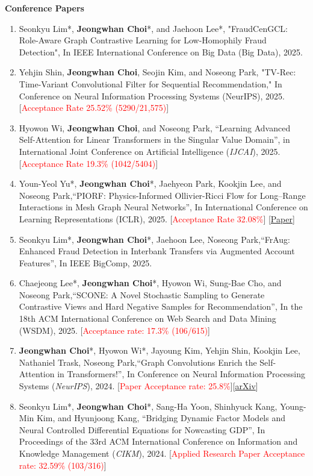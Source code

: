 \documentclass[10pt]{article}
\newenvironment{changemargin}[2]{
  \begin{list}{}{
    \setlength{\topsep}{0pt}
    \setlength{\leftmargin}{#1}
    \setlength{\rightmargin}{#2}
    \setlength{\listparindent}{\parindent}
    \setlength{\itemindent}{\parindent}
    \setlength{\parsep}{\parskip}
  }
  \item[]}{\end{list}
}
\newcommand{\RED}[1]{\textcolor{red}{#1}}
\newenvironment{body} {
	\vspace*{-16pt}
	\begin{changemargin}{-0.25in}{-0.5in}
  }
	{\end{changemargin}
}
\begin{document}
\begin{body}
\textbf{Conference Papers}
\begin{enumerate}
    \item Seonkyu Lim*, \textbf{Jeongwhan Choi}*, and Jaehoon Lee*, "FraudCenGCL: Role-Aware Graph Contrastive Learning for Low-Homophily Fraud Detection",  In IEEE International Conference on Big Data (Big Data), 2025.
    \item Yehjin Shin, \textbf{Jeongwhan Choi}, Seojin Kim, and Noseong Park, "TV-Rec: Time-Variant Convolutional Filter for Sequential Recommendation,"  In Conference on Neural Information Processing Systems (NeurIPS), 2025.  [\RED{Acceptance Rate 25.52\% (5290/21,575)}]
    \item Hyowon Wi, \textbf{Jeongwhan Choi}, and Noseong Park, ``Learning Advanced Self-Attention for Linear Transformers in the Singular Value Domain'', in International Joint Conference on Artificial Intelligence (\textit{IJCAI}), 2025. [\RED{Acceptance Rate 19.3\% (1042/5404)}]
    \item Youn-Yeol Yu*, \textbf{Jeongwhan Choi}*, Jaehyeon Park, Kookjin Lee, and Noseong Park,``PIORF: Physics-Informed Ollivier-Ricci Flow for Long–Range Interactions in Mesh Graph Neural Networks'', In International Conference on Learning Representations (ICLR), 2025. [\RED{Acceptance Rate 32.08\%}] [\href{https://openreview.net/forum?id=qkBBHixPow}{Paper}]
    \item Seonkyu Lim*, \textbf{Jeongwhan Choi}*, Jaehoon Lee, Noseong Park,``FrAug: Enhanced Fraud Detection in Interbank Transfers via Augmented Account Features'', In IEEE BigComp, 2025.
    \item Chaejeong Lee*, \textbf{Jeongwhan Choi}*, Hyowon Wi,  Sung-Bae Cho, and Noseong Park,``SCONE: A Novel Stochastic Sampling to Generate Contrastive Views and Hard Negative Samples for Recommendation'', In the 18th ACM International Conference on Web Search and Data Mining (WSDM), 2025. [\RED{Acceptance rate: 17.3\% (106/615)}]
    \item \textbf{Jeongwhan Choi}*, Hyowon Wi*, Jayoung Kim, Yehjin Shin, Kookjin Lee, Nathaniel Trask, Noseong Park,``Graph Convolutions Enrich the Self-Attention in Transformers!'', In Conference on Neural Information Processing Systems (\textit{NeurIPS}), 2024. [\RED{Paper Acceptance rate: 25.8\%}][\href{https://arxiv.org/abs/2312.04234}{arXiv}]
    \item Seonkyu Lim*, \textbf{Jeongwhan Choi}*, Sang-Ha Yoon, Shinhyuck Kang, Young-Min Kim, and Hyunjoong Kang, ``Bridging Dynamic Factor Models and Neural Controlled Differential Equations for Nowcasting GDP'', In Proceedings of the 33rd ACM International Conference on Information and Knowledge Management (\textit{CIKM}), 2024. [\RED{Applied Research Paper Acceptance rate: 32.59\% (103/316)}]

\end{enumerate}
\end{body}
\end{document}
